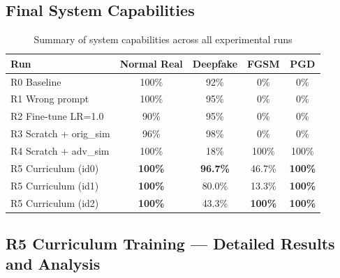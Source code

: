 \documentclass[12pt,a4paper]{article}
\begin{document}
\subsection{Final System Capabilities}

\begin{table}[H]
\centering
\caption{Summary of system capabilities across all experimental runs}
\begin{tabular}{@{}lcccc@{}}
\toprule
\textbf{Run} & \textbf{Normal Real} & \textbf{Deepfake} & \textbf{FGSM} & \textbf{PGD} \\
\midrule
R0 Baseline             & 100\% & 92\%  & 0\%   & 0\%   \\
R1 Wrong prompt         & 100\% & 95\%  & 0\%   & 0\%   \\
R2 Fine-tune LR=1.0     & 90\%  & 95\%  & 0\%   & 0\%   \\
R3 Scratch + orig\_sim  & 96\%  & 98\%  & 0\%   & 0\%   \\
R4 Scratch + adv\_sim   & 100\% & 18\%  & 100\% & 100\% \\
R5 Curriculum (id0)    & \textbf{100\%} & \textbf{96.7\%} & 46.7\% & \textbf{100\%} \\
R5 Curriculum (id1)    & \textbf{100\%} & 80.0\%          & 13.3\% & \textbf{100\%} \\
R5 Curriculum (id2)    & \textbf{100\%} & 43.3\%          & \textbf{100\%}  & \textbf{100\%} \\
\bottomrule
\end{tabular}
\end{table}

\subsection{R5 Curriculum Training — Detailed Results and Analysis}
\end{document}
